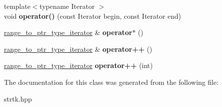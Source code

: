 \begin{DoxyCompactItemize}
\item 
\hypertarget{classstrtk_1_1range__to__ptr__type__iterator_aef33d1f18d62fd382ede6c9c7f725cda}{{\footnotesize template$<$typename Iterator $>$ }\\void {\bfseries operator()} (const Iterator begin, const Iterator end)}\label{classstrtk_1_1range__to__ptr__type__iterator_aef33d1f18d62fd382ede6c9c7f725cda}

\item 
\hypertarget{classstrtk_1_1range__to__ptr__type__iterator_a9a209d4ca0002d50b1e841dfe73a6cce}{\hyperlink{classstrtk_1_1range__to__ptr__type__iterator}{range\-\_\-to\-\_\-ptr\-\_\-type\-\_\-iterator} \& {\bfseries operator$\ast$} ()}\label{classstrtk_1_1range__to__ptr__type__iterator_a9a209d4ca0002d50b1e841dfe73a6cce}

\item 
\hypertarget{classstrtk_1_1range__to__ptr__type__iterator_a1be3dc2e4f582d418835074f7fd76a6e}{\hyperlink{classstrtk_1_1range__to__ptr__type__iterator}{range\-\_\-to\-\_\-ptr\-\_\-type\-\_\-iterator} \& {\bfseries operator++} ()}\label{classstrtk_1_1range__to__ptr__type__iterator_a1be3dc2e4f582d418835074f7fd76a6e}

\item 
\hypertarget{classstrtk_1_1range__to__ptr__type__iterator_a74659e255fefa0d49e36535ba2dc2acd}{\hyperlink{classstrtk_1_1range__to__ptr__type__iterator}{range\-\_\-to\-\_\-ptr\-\_\-type\-\_\-iterator} {\bfseries operator++} (int)}\label{classstrtk_1_1range__to__ptr__type__iterator_a74659e255fefa0d49e36535ba2dc2acd}

\end{DoxyCompactItemize}


The documentation for this class was generated from the following file\-:\begin{DoxyCompactItemize}
\item 
strtk.\-hpp\end{DoxyCompactItemize}
